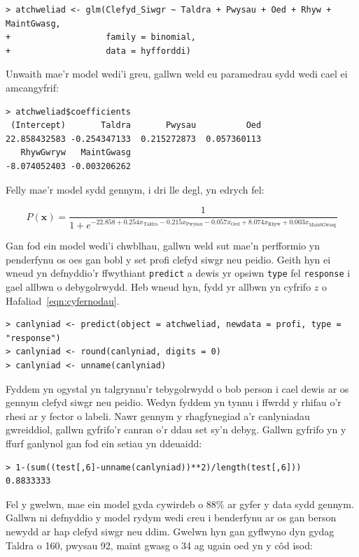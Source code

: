 \begin{verbatim}
> atchweliad <- glm(Clefyd_Siwgr ~ Taldra + Pwysau + Oed + Rhyw + MaintGwasg,
+                   family = binomial,
+                   data = hyfforddi)
\end{verbatim}

Unwaith mae'r model wedi'i greu, gallwn weld eu paramedrau sydd wedi cael ei amcangyfrif:

\begin{verbatim}
> atchweliad$coefficients
 (Intercept)       Taldra       Pwysau          Oed 
22.858432583 -0.254347133  0.215272873  0.057360113 
   RhywGwryw   MaintGwasg 
-8.074052403 -0.003206262 
\end{verbatim}

Felly mae'r model sydd gennym, i dri lle degl, yn edrych fel:

$$ P(\mathbf{x}) = \frac{1}{1 + e^{-22.858 + 0.254 x_{\text{Taldra}} - 0.215 x_{\text{Pwysau}} - 0.057 x_{\text{Oed}} + 8.074 x_{\text{Rhyw}} + 0.003 x_{\text{MaintGwasg}}}} $$

Gan fod ein model wedi'i chwblhau, gallwn weld sut mae'n perfformio yn penderfynu os oes gan bobl y set profi clefyd siwgr neu peidio. Geith hyn ei wneud yn defnyddio'r ffwythiant \texttt{predict} a dewis yr opsiwn \texttt{type} fel \texttt{response} i gael allbwn o debygolrwydd. Heb wneud hyn, fydd yr allbwn yn cyfrifo $z$ o Hafaliad~\ref{eqn:cyfernodau}. 

\begin{verbatim}
> canlyniad <- predict(object = atchweliad, newdata = profi, type = "response")
> canlyniad <- round(canlyniad, digits = 0)
> canlyniad <- unname(canlyniad)
\end{verbatim}

Fyddem yn ogystal yn talgrynnu'r tebygolrwydd o bob person i cael dewis ar os gennym clefyd siwgr neu peidio. Wedyn fyddem yn tynnu i ffwrdd y rhifau o'r rhesi ar y fector o labeli. Nawr gennym y rhagfynegiad a'r canlyniadau gwreiddiol, gallwn gyfrifo'r canran o'r ddau set sy'n debyg. Gallwn gyfrifo yn y ffurf ganlynol gan fod ein setiau yn ddeuaidd:

\begin{verbatim}
> 1-(sum((test[,6]-unname(canlyniad))**2)/length(test[,6]))
0.8833333
\end{verbatim}

Fel y gwelwn, mae ein model gyda cywirdeb o $88\%$ ar gyfer y data sydd gennym. Gallwn ni defnyddio y model rydym wedi creu i benderfynu ar os gan berson newydd ar hap clefyd siwgr neu ddim. Gwelwn hyn gan gyflwyno dyn gydag Taldra o 160, pwysau 92, maint gwasg o 34 ag ugain oed yn y c\^{o}d isod: 

